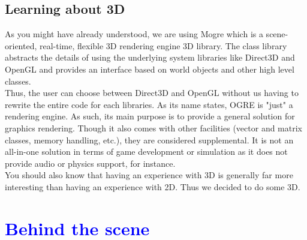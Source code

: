 \documentclass[article]{report} %
\begin{document}
						\section{Learning about 3D}
								As you might have already understood, we are using \ac{Mogre} which is a scene-oriented, real-time, flexible 3D rendering engine 3D library.\newline
								The class library abstracts the details of using the underlying system libraries like Direct3D and OpenGL and provides an interface based on world objects and other high level classes.\\
								
								Thus, the user can choose between Direct3D and OpenGL without us having to rewrite the entire code for each libraries. As its name states, \ac{OGRE} is "just" a rendering engine. As such, its main purpose is to provide a general solution for graphics rendering. Though it also comes with other facilities (vector and matrix classes, memory handling, etc.), they are considered supplemental. It is not an all-in-one solution in terms of game development or simulation as it does not provide audio or physics support, for instance.\\
								
								You should also know that having an experience with 3D is generally far more interesting than having an experience with 2D. Thus we decided to do some 3D.
								
								
				\chapter{\textcolor{blue}{Behind the scene}}
				
\end{document}
